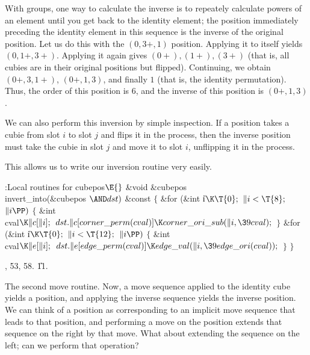 With groups, one way to calculate the inverse is to repeately
calculate powers of an element until you get back to the identity
element; the position immediately preceding the identity element in
this sequence is the inverse of the original position.  Let us do this
with the $(0,3+,1)$ position.  Applying it to itself yields
$(0,1+,3+)$.  Applying it again gives $(0+),(1+),(3+)$ (that is, all
cubies are in their original positions but flipped).  Continuing, we
obtain $(0+,3,1+)$, $(0+,1,3)$, and finally $1$ (that is, the identity
permutation).  Thus, the order of this position is 6, and the inverse
of this position is $(0+,1,3)$.

We can also perform this inversion by simple inspection.  If a
position takes a cubie from slot $i$ to slot $j$ and flips it in the
process, then the inverse position must take the cubie in slot $j$ and
move it to slot $i$, unflipping it in the process.

This allows us to write our inversion routine very easily.

\Y\B\4:Local routines for cubepos\X${}\E{}$\6
\&{void} \&{cubepos}\DC\\{invert\_into}(\&{cubepos} ${}{\AND}\\{dst}){}$ %
\&{const}\1\1\2\2\6
${}\{{}$\1\6
\&{for} (\&{int} \|i${}\K\T{0};{}$ ${}\|i<\T{8};{}$ ${}\|i\PP){}$\5
${}\{{}$\1\6
\&{int} \\{cval}${}\K\|c[\|i];{}$\7
${}\\{dst}.\|c[\\{corner\_perm}(\\{cval})]\K\\{corner\_ori\_sub}(\|i,\39%
\\{cval});{}$\6
\4${}\}{}$\2\6
\&{for} (\&{int} \|i${}\K\T{0};{}$ ${}\|i<\T{12};{}$ ${}\|i\PP){}$\5
${}\{{}$\1\6
\&{int} \\{cval}${}\K\|e[\|i];{}$\7
${}\\{dst}.\|e[\\{edge\_perm}(\\{cval})]\K\\{edge\_val}(\|i,\39\\{edge\_ori}(%
\\{cval}));{}$\6
\4${}\}{}$\2\6
\4${}\}{}$\2\par
{}, 53, 58.
\U11.\fi

The second move routine.
Now, a move sequence applied to the identity cube yields a position,
and applying the inverse sequence yields the inverse position.  We can
think of a position as corresponding to an implicit move sequence that
leads to that position, and performing a move on the position extends
that sequence on the right by that move.  What about extending the
sequence on the left; can we perform that operation?

